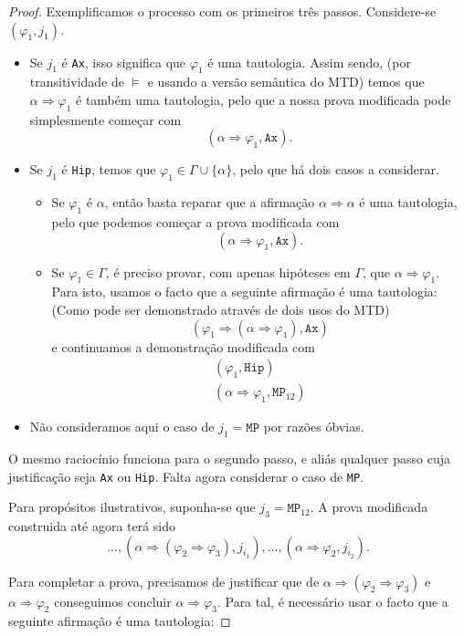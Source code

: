 \documentclass{report}
\theoremstyle{definition}
\theoremstyle{remark}
\newcommand{\imply}{\mathbin{\Rightarrow}}
\begin{document}
\begin{proof}
	Exemplificamos o processo com os primeiros três passos. Considere-se $(\varphi_1, j_1)$.
	
	\begin{itemize}
	\item Se $j_1$ é \texttt{Ax}, isso significa que $\varphi_1$ é uma tautologia. Assim sendo, (por transitividade de $\vDash$ e usando a versão semântica do MTD) temos que $\alpha \imply \varphi_1$ é também uma tautologia, pelo que a nossa prova modificada pode simplesmente começar com
	\[(\alpha \imply \varphi_1, \texttt{Ax}).\]
	
	\item Se $j_1$ é \texttt{Hip}, temos que $\varphi_1 \in \Gamma \cup \{\alpha\}$, pelo que há dois casos a considerar.
	\begin{itemize}
	\item Se $\varphi_1$ é $\alpha$, então basta reparar que a afirmação $\alpha \imply \alpha$ é uma tautologia, pelo que podemos começar a prova modificada com
	\[(\alpha \imply \varphi_1, \texttt{Ax}).\]
	
	\item Se $\varphi_1 \in \Gamma$, é preciso provar, com apenas hipóteses em $\Gamma$, que $\alpha \imply \varphi_1$. Para isto, usamos o facto que a seguinte afirmação é uma tautologia: (Como pode ser demonstrado através de dois usos do MTD)
	\[(\varphi_1 \imply (\alpha \imply \varphi_1), \texttt{Ax})\]
	e continuamos a demonstração modificada com
	\begin{gather*}
	(\varphi_1, \texttt{Hip})\\
	(\alpha \imply \varphi_1, \texttt{MP}_{12})
	\end{gather*}
	\end{itemize}
	
	\item Não consideramos aqui o caso de $j_1 = \texttt{MP}$ por razões óbvias.
	\end{itemize}
	
	O mesmo raciocínio funciona para o segundo passo, e aliás qualquer passo cuja justificação seja \texttt{Ax} ou \texttt{Hip}. Falta agora considerar o caso de \texttt{MP}.
	
	Para propósitos ilustrativos, suponha-se que $j_3 = \texttt{MP}_{12}$. A prova modificada construida até agora terá sido
	\[\dots, (\alpha \imply (\varphi_2 \imply \varphi_3), j_{i_1}), \dots, (\alpha \imply \varphi_2, j_{i_2}).\]
	
	Para completar a prova, precisamos de justificar que de $\alpha \imply (\varphi_2 \imply \varphi_3)$ e $\alpha \imply \varphi_2$ conseguimos concluir $\alpha \imply \varphi_3$.  Para tal, é necessário usar o facto que a seguinte afirmação é uma tautologia:
	

\end{proof}
\end{document}
